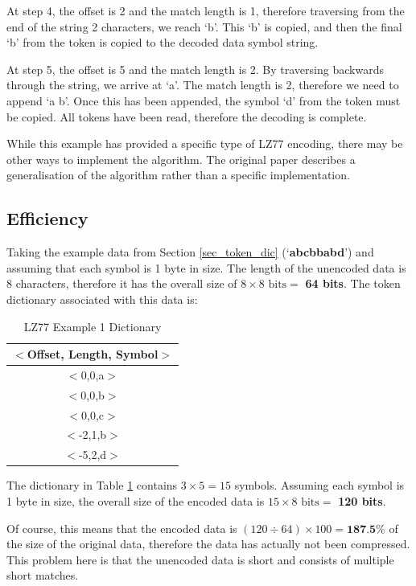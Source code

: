 \documentclass[12pt]{article}
\begin{document}
At step 4, the offset is 2 and the match length is 1, therefore traversing from the end of the string 2 characters, we reach `b'. This `b' is copied, and then the final `b' from the token is copied to the decoded data symbol string.

At step 5, the offset is 5 and the match length is 2. By traversing backwards through the string, we arrive at `a'. The match length is 2, therefore we need to append `a b'. Once this has been appended, the symbol `d' from the token must be copied. All tokens have been read, therefore the decoding is complete.

While this example has provided a specific type of LZ77 encoding, there may be other ways to implement the algorithm. The original paper \citep{lz77} describes a generalisation of the algorithm rather than a specific implementation.

\subsection{Efficiency}

Taking the example data from Section \ref{sec_token_dic} (`\textbf{abcbbabd}') and assuming that each symbol is 1 byte in size. The length of the unencoded data is 8 characters, therefore it has the overall size of $8 \times 8 \text{ bits} =$ \textbf{64 bits}. The token dictionary associated with this data is:

\begin{table}[H]
	\centering
	\begin{tabular}{| c |} 
		\hline
		$<$Offset, Length, Symbol$>$\\
		\hline
		$<$0,0,a$>$\\
		$<$0,0,b$>$\\
		$<$0,0,c$>$\\
		$<$-2,1,b$>$\\
		$<$-5,2,d$>$\\
		\hline
	\end{tabular}
	\caption{LZ77 Example 1 Dictionary}
	\label{dic_ex1}
\end{table}

The dictionary in Table \ref{dic_ex1} contains $3 \times 5 = 15$ symbols. Assuming each symbol is 1 byte in size, the overall size of the encoded data is $15 \times 8 \text{ bits} =$ \textbf{120 bits}.

Of course, this means that the encoded data is $(120\div64)\times100=\textbf{187.5\%}$ of the size of the original data, therefore the data has actually not been compressed. This problem here is that the unencoded data is short and consists of multiple short matches.
\end{document}
